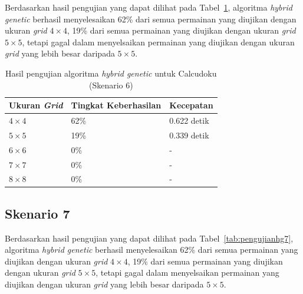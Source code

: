 Berdasarkan hasil pengujian yang dapat dilihat pada Tabel~\ref{tab:pengujianhg6}, algoritma \textit{hybrid genetic} berhasil menyelesaikan 62\% dari semua permainan yang diujikan dengan ukuran \textit{grid} \begin{math}4 \times 4\end{math}, 19\% dari semua permainan yang diujikan dengan ukuran \textit{grid} \begin{math}5 \times 5\end{math}, tetapi gagal dalam menyelsaikan permainan yang diujikan dengan ukuran \textit{grid} yang lebih besar daripada \begin{math}5 \times 5\end{math}.
\begin{table}
\centering
\captionsetup{justification=centering}
\caption[Hasil pengujian algoritma \textit{hybrid genetic} untuk Calcudoku (Skenario 6)]{Hasil pengujian algoritma \textit{hybrid genetic} untuk Calcudoku (Skenario 6)}
\begin{tabular}{| l | l | l |}
\hline
Ukuran \textit{Grid} & Tingkat Keberhasilan & Kecepatan \\
\hline \hline
\begin{math}4 \times 4\end{math} & 62\% & 0.622 detik \\
\hline
\begin{math}5 \times 5\end{math} & 19\% & 0.339 detik \\
\hline
\begin{math}6 \times 6\end{math} & 0\% & - \\
\hline
\begin{math}7 \times 7\end{math} & 0\% & - \\
\hline
\begin{math}8 \times 8\end{math} & 0\% & - \\
\hline
\end{tabular}
\label{tab:pengujianhg6}
\end{table}

\subsection{Skenario 7}
\label{sec:skenario7}

Berdasarkan hasil pengujian yang dapat dilihat pada Tabel~\ref{tab:pengujianhg7}, algoritma \textit{hybrid genetic} berhasil menyelesaikan 62\% dari semua permainan yang diujikan dengan ukuran \textit{grid} \begin{math}4 \times 4\end{math}, 19\% dari semua permainan yang diujikan dengan ukuran \textit{grid} \begin{math}5 \times 5\end{math}, tetapi gagal dalam menyelsaikan permainan yang diujikan dengan ukuran \textit{grid} yang lebih besar daripada \begin{math}5 \times 5\end{math}. 

